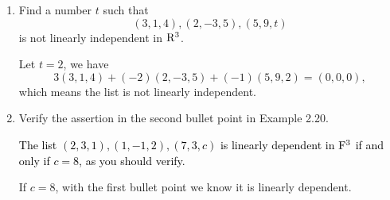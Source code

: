 \begin{enumerate}
\begin{solution}
        \end{solution}
    \item Find a number $t$ such that 
        \[ (3,1,4), (2,-3,5), (5,9,t)\]
        is not linearly independent in $\mathrm{R}^3$.
        \begin{solution}
            Let $t = 2$, we have 
            \[ 3(3,1,4) + (-2)(2,-3,5) + (-1)(5,9,2) = (0,0,0),\]
            which means the list is not linearly independent.
        \end{solution}
    \item Verify the assertion in the second bullet point in Example 2.20.
        \begin{solution}
            \textcolor{black}{The list $(2,3,1), (1,-1,2), (7,3,c)$ is linearly dependent in $\mathrm{F}^3$ if and only if $c=8$, as you should verify.}

            If $c = 8$, with the first bullet point we know it is linearly dependent.
            

\end{solution}
\end{enumerate}
